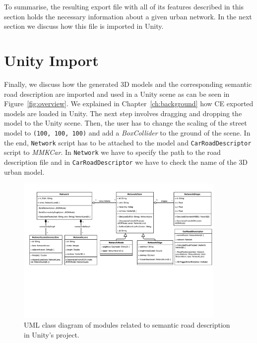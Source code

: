 To summarise, the resulting export file with all of its features described in this section holds the necessary information about a given urban network. In the next section we discuss how this file is imported in Unity.

\section{Unity Import}

Finally, we discuss how the generated 3D models and the corresponding semantic road description are imported and used in a Unity scene as can be seen in Figure~\ref{fig:overview}. We explained in Chapter~\ref{ch:background} how CE exported models are loaded in Unity. The next step involves dragging and dropping the model to the Unity scene. Then, the user has to change the scaling of the street model to \texttt{(100, 100, 100)} and add a \emph{BoxCollider} to the ground of the scene. In the end, \texttt{Network} script has to be attached to the model and \texttt{CarRoadDescriptor} script to \emph{MMKCar}. In \texttt{Network} we have to specify the path to the road description file and in \texttt{CarRoadDescriptor} we have to check the name of the 3D urban model.

\begin{figure}[htb]
	\centering
	\includegraphics[width=0.9\textwidth]{figures/unity-uml}
	\caption{UML class diagram of modules related to semantic road description in Unity's project.}
	\label{fig:unity-uml-1}
\end{figure}

